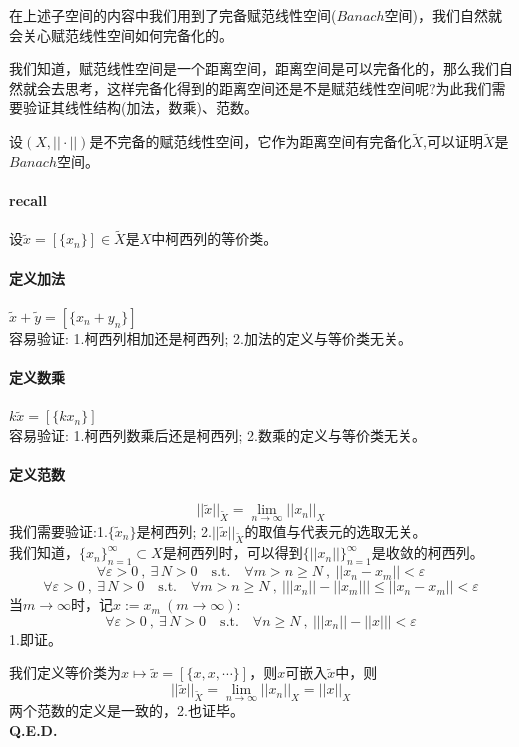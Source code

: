 在上述子空间的内容中我们用到了完备赋范线性空间($Banach$空间)，我们自然就会关心赋范线性空间如何完备化的。

我们知道，赋范线性空间是一个距离空间，距离空间是可以完备化的，那么我们自然就会去思考，这样完备化得到的距离空间还是不是赋范线性空间呢?为此我们需要验证其线性结构(加法，数乘)、范数。
\begin{theorem}
    设$(X,||\cdot||)$是不完备的赋范线性空间，它作为距离空间有完备化$\tilde{X}$,可以证明$\tilde{X}$是$Banach$空间。
\end{theorem}
\paragraph*{recall} \quad 设$\tilde{x}=[\{x_n\}] \in \tilde{X}$是$X$中柯西列的等价类。
\paragraph*{定义加法} \quad $\tilde{x}+\tilde{y}=[\{x_n+y_n\}]$\\
容易验证: 1.柯西列相加还是柯西列; 2.加法的定义与等价类无关。
\paragraph*{定义数乘} \quad $k\tilde{x}=[\{kx_n\}]$\\
容易验证: 1.柯西列数乘后还是柯西列; 2.数乘的定义与等价类无关。
\paragraph*{定义范数}
\[||\tilde{x}||_{\tilde{X}}=\lim_{n \to \infty}||x_n||_X\]
我们需要验证:1.$\{\tilde{x}_n\}$是柯西列; 2.$||\tilde{x}||_{\tilde{X}}$的取值与代表元的选取无关。\\
我们知道，$\{x_n\}_{n=1}^{\infty} \subset X$是柯西列时，可以得到$\{||x_n||\}_{n=1}^{\infty}$是收敛的柯西列。
\[\forall \varepsilon>0 \ , \ \exists \, N>0 \quad \text{s.t.} \quad \forall m>n \geq N \ , \ ||x_n-x_m||<\varepsilon\]
\[\forall \varepsilon>0 \ , \ \exists \, N>0 \quad \text{s.t.} \quad \forall m>n \geq N \ , \ \left|||x_n||-||x_m||\right| \leq ||x_n-x_m||<\varepsilon\]
当$m \to \infty$时，记$x:=x_m \ (m \to \infty)$:
\[\forall \varepsilon>0 \ , \ \exists \, N>0 \quad \text{s.t.} \quad \forall n \geq N \ , \ \left|||x_n||-||x||\right|<\varepsilon\]
1.即证。

我们定义等价类为$x \mapsto \tilde{x}=[\{x,x,\cdots\}]$，则$x$可嵌入$\tilde{x}$中，则
\[||\tilde{x}||_{\tilde{X}}=\lim_{n \to \infty}||x_n||_X=||x||_X\]
两个范数的定义是一致的，2.也证毕。\\
\textbf{Q.E.D.}

